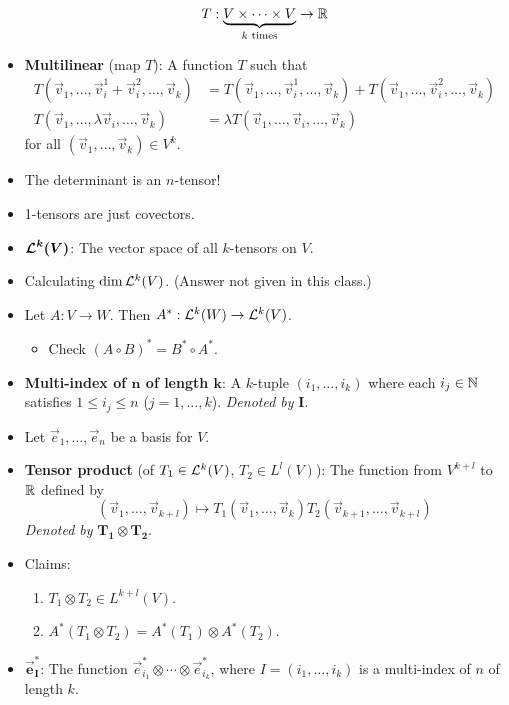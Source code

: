 \documentclass[../notes.tex]{subfiles}
\begin{document}
\begin{itemize}
\begin{equation*}
        T:\underbrace{V\times\cdots\times V}_{k\text{ times}}\to\R
    \end{equation*}
    \item \textbf{Multilinear} (map $T$): A function $T$ such that
    \begin{align*}
        T(\vec{v}_1,\dots,\vec{v}_i^1+\vec{v}_i^2,\dots,\vec{v}_k) &= T(\vec{v}_1,\dots,\vec{v}_i^1,\dots,\vec{v}_k)+T(\vec{v}_1,\dots,\vec{v}_i^2,\dots,\vec{v}_k)\\
        T(\vec{v}_1,\dots,\lambda \vec{v}_i,\dots,\vec{v}_k) &= \lambda T(\vec{v}_1,\dots,\vec{v}_i,\dots,\vec{v}_k)
    \end{align*}
    for all $(\vec{v}_1,\dots,\vec{v}_k)\in V^k$.
    \item The determinant is an $n$-tensor!
    \item 1-tensors are just covectors.
    \item $\bm{\lin[k]{V}}$: The vector space of all $k$-tensors on $V$.
    \item Calculating $\dim \lin[k]{V}$. (Answer not given in this class.)
    \item Let $A:V\to W$. Then $A^*:\lin[k]{W}\to\lin[k]{V}$.
    \begin{itemize}
        \item Check $(A\circ B)^*=B^*\circ A^*$.
    \end{itemize}
    \item \textbf{Multi-index of $\bm{n}$ of length $\bm{k}$}: A $k$-tuple $(i_1,\dots,i_k)$ where each $i_j\in\N$ satisfies $1\leq i_j\leq n$ ($j=1,\dots,k$). \emph{Denoted by} $\bm{I}$.
    \item Let $\vec{e}_1,\dots,\vec{e}_n$ be a basis for $V$.
    \item \textbf{Tensor product} (of $T_1\in \lin[k]{V}$, $T_2\in L^l(V)$): The function from $V^{k+l}$ to $\R$ defined by
    \begin{equation*}
        (\vec{v}_1,\dots,\vec{v}_{k+l}) \mapsto T_1(\vec{v}_1,\dots,\vec{v}_k)T_2(\vec{v}_{k+1},\dots,\vec{v}_{k+l})
    \end{equation*}
    \emph{Denoted by} $\bm{T_1\otimes T_2}$.
    \item Claims:
    \begin{enumerate}
        \item $T_1\otimes T_2\in L^{k+l}(V)$.
        \item $A^*(T_1\otimes T_2)=A^*(T_1)\otimes A^*(T_2)$.
    \end{enumerate}
    \item $\bm{\vec{e}_I^*}$: The function $\vec{e}_{i_1}^*\otimes\cdots\otimes\vec{e}_{i_k}^*$, where $I=(i_1,\dots,i_k)$ is a multi-index of $n$ of length $k$.

\end{itemize}
\end{document}
